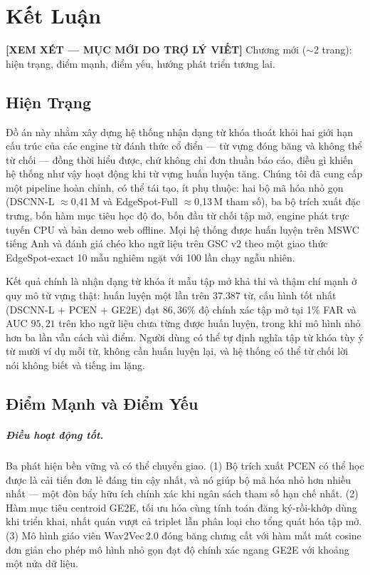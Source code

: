 \documentclass[12pt,a4paper]{report}
\newcommand{\reviewnote}[1]{%
  \par\smallskip\noindent
  \colorbox{yellow!35}{\parbox{0.97\linewidth}{\small\textbf{[XEM XÉT — MỤC MỚI DO TRỢ LÝ VIẾT]}\; #1}}%
  \par\smallskip}
\begin{document}
\chapter{Kết Luận}\label{ch:conclusion}
\reviewnote{Chương mới ($\sim$2 trang): hiện trạng, điểm mạnh, điểm yếu, hướng
phát triển tương lai.}

\section{Hiện Trạng}\label{sec:status}

Đồ án này nhằm xây dựng hệ thống nhận dạng từ khóa thoát khỏi hai giới hạn cấu
trúc của các engine từ đánh thức cổ điển --- từ vựng đóng băng và không thể từ
chối --- đồng thời hiểu được, chứ không chỉ đơn thuần báo cáo, điều gì khiến hệ
thống như vậy hoạt động khi từ vựng huấn luyện tăng. Chúng tôi đã cung cấp một
pipeline hoàn chỉnh, có thể tái tạo, ít phụ thuộc: hai bộ mã hóa nhỏ gọn (DSCNN-L
$\approx$0{,}41\,M và EdgeSpot-Full $\approx$0{,}13\,M tham số), ba bộ trích xuất
đặc trưng, bốn hàm mục tiêu học độ đo, bốn đầu từ chối tập mở, engine phát trực
tuyến CPU và bản demo web offline. Mọi hệ thống được huấn luyện trên MSWC tiếng
Anh và đánh giá chéo kho ngữ liệu trên GSC v2 theo một giao thức EdgeSpot-exact
10 mẫu nghiêm ngặt với 100 lần chạy ngẫu nhiên.

Kết quả chính là nhận dạng từ khóa ít mẫu tập mở khả thi và thậm chí mạnh ở quy
mô từ vựng thật: huấn luyện một lần trên $37{.}387$ từ, cấu hình tốt nhất
(DSCNN-L $+$ PCEN $+$ GE2E) đạt $86{,}36\%$ độ chính xác tập mở tại 1\% FAR và
AUC $95{,}21$ trên kho ngữ liệu chưa từng được huấn luyện, trong khi mô hình nhỏ
hơn ba lần vẫn cách vài điểm. Người dùng có thể tự định nghĩa tập từ khóa tùy ý
từ mười ví dụ mỗi từ, không cần huấn luyện lại, và hệ thống có thể từ chối lời
nói không biết và tiếng im lặng.

\section{Điểm Mạnh và Điểm Yếu}\label{sec:goodbad}

\paragraph{Điều hoạt động tốt.} Ba phát hiện bền vững và có thể chuyển giao.
(1) Bộ trích xuất PCEN có thể học được là cải tiến đơn lẻ đáng tin cậy nhất, và
nó giúp bộ mã hóa nhỏ hơn nhiều nhất --- một đòn bẩy hữu ích chính xác khi ngân
sách tham số hạn chế nhất. (2) Hàm mục tiêu centroid GE2E, tối ưu hóa cùng tính
toán đăng ký-rồi-khớp dùng khi triển khai, nhất quán vượt cả triplet lẫn phân
loại cho tổng quát hóa tập mở. (3) Mô hình giáo viên Wav2Vec\,2.0 đóng băng chưng
cất với hàm mất mát cosine đơn giản cho phép mô hình nhỏ gọn đạt độ chính xác
ngang GE2E với khoảng một nửa dữ liệu.
\end{document}
